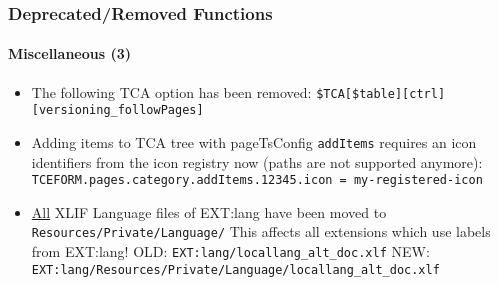 \begin{frame}[fragile]
	\frametitle{Deprecated/Removed Functions}
	\framesubtitle{Miscellaneous (3)}


	\begin{itemize}

		\item The following TCA option has been removed:\newline
			\texttt{\$TCA[\$table][ctrl][versioning\_followPages]}

		\item Adding items to TCA tree with pageTsConfig \texttt{addItems} requires an icon identifiers
			from the icon registry now (paths are not supported anymore):\newline
			\smaller
				\texttt{TCEFORM.pages.category.addItems.12345.icon = my-registered-icon}
			\normalsize

		\item \underline{All} XLIF Language files of EXT:lang have been moved to\newline
			\texttt{Resources/Private/Language/}\newline
			This affects all extensions which use labels from EXT:lang!\newline
			\smaller
				OLD: \texttt{EXT:lang/locallang\_alt\_doc.xlf}\newline
				NEW: \texttt{EXT:lang/Resources/Private/Language/locallang\_alt\_doc.xlf}
			\normalsize

	\end{itemize}

\end{frame}







